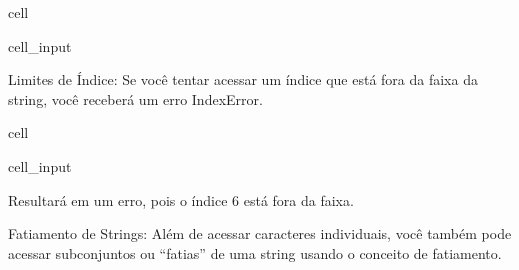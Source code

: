 \documentclass[letterpaper,10pt,english]{jupyterBook}
\begin{document}
\begin{sphinxuseclass}{cell}\begin{sphinxVerbatimInput}

\begin{sphinxuseclass}{cell_input}
\begin{sphinxVerbatim}[commandchars=\\\{\}]
\PYG{p}{[}\PYG{p}{]}  
\PYG{p}{[}\PYG{p}{]}  
\end{sphinxVerbatim}

\end{sphinxuseclass}\end{sphinxVerbatimInput}

\end{sphinxuseclass}
\sphinxAtStartPar
Limites de Índice: Se você tentar acessar um índice que está fora da faixa da string, você receberá um erro IndexError.

\begin{sphinxuseclass}{cell}\begin{sphinxVerbatimInput}

\begin{sphinxuseclass}{cell_input}
\begin{sphinxVerbatim}[commandchars=\\\{\}]
\PYG{p}{[}\PYG{p}{]}  
\end{sphinxVerbatim}

\end{sphinxuseclass}\end{sphinxVerbatimInput}

\end{sphinxuseclass}
\sphinxAtStartPar
Resultará em um erro, pois o índice 6 está fora da faixa.

\sphinxAtStartPar
Fatiamento de Strings: Além de acessar caracteres individuais, você também pode acessar subconjuntos ou “fatias” de uma string usando o conceito de fatiamento.
\end{document}
